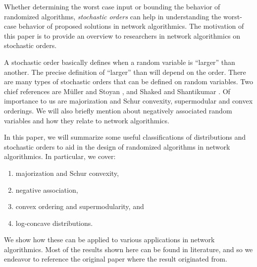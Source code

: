 Whether determining the worst case input or bounding the
behavior of randomized algorithms, \textit{stochastic orders} can help in understanding the worst-case behavior of proposed
solutions in network algorithmics. The motivation of this paper is to provide an overview to researchers in
network algorithmics on stochastic orders.

A stochastic order basically defines when a random variable is ``larger'' than another. The precise definition
of ``larger'' than will depend on the order. 
There are many types of stochastic orders that can be defined on random variables. Two chief references are
M\"{u}ller and Stoyan \cite{Muller02Risk}, and Shaked and Shantikumar \cite{Shaked07Sorders}. Of importance
to us are majorization and Schur convexity, supermodular and convex orderings. We will also briefly mention about negatively associated
random variables and how they relate to network algorithmics.

In this paper, we will summarize some useful classifications of distributions and stochastic orders to aid
in the design of randomized algorithms in network algorithmics. 
In particular, we cover:
\begin{enumerate}
\item majorization and Schur convexity, 
\item negative association,
\item convex ordering and supermodularity, and
\item log-concave distributions.
\end{enumerate}
We show how these can be applied to various applications in network algorithmics. Most of the 
results shown here can be found in literature, and so we endeavor to reference the original 
paper where the result originated from. 





